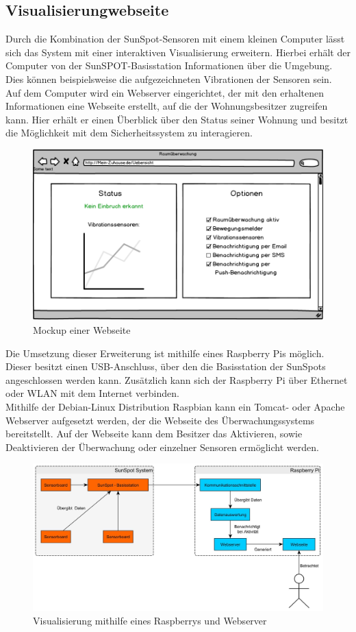 \subsection{Visualisierungwebseite}\label{ss:visualisierung}



Durch die Kombination der SunSpot-Sensoren mit einem kleinen Computer lässt sich das System mit einer interaktiven Visualisierung erweitern. Hierbei erhält der Computer von der SunSPOT-Basisstation Informationen über die Umgebung. Dies können beispielsweise die aufgezeichneten Vibrationen der Sensoren sein.\\
Auf dem Computer wird ein Webserver eingerichtet, der mit den erhaltenen Informationen eine Webseite erstellt, auf die der Wohnungsbesitzer zugreifen kann. Hier erhält er einen Überblick über den Status seiner Wohnung und besitzt die Möglichkeit mit dem Sicherheitssystem zu interagieren. 

\vspace{5 mm}
\begin{figure}[H] 
	\centering
	\includegraphics[scale=0.47]{Bilder/mockupwebsite}
	\caption{Mockup einer Webseite}
	\label{f:mockupwebsite}
\end{figure}

Die Umsetzung dieser Erweiterung ist mithilfe eines Raspberry Pis möglich. Dieser besitzt einen USB-Anschluss, über den die Basisstation der SunSpots angeschlossen werden kann. Zusätzlich kann sich der Raspberry Pi über Ethernet oder WLAN mit dem Internet verbinden.\\
Mithilfe der Debian-Linux Distribution Raspbian kann ein Tomcat- oder Apache Webserver aufgesetzt werden, der die Webseite des Überwachungssystems bereitstellt. Auf der Webseite kann dem Besitzer das Aktivieren, sowie Deaktivieren der Überwachung oder einzelner Sensoren ermöglicht werden.

\begin{figure}[H] 
	\centering
	\includegraphics[scale=0.25]{Bilder/Visualisierung}
	\caption{Visualisierung mithilfe eines Raspberrys und Webserver}
	\label{f:visualisierung}
\end{figure}